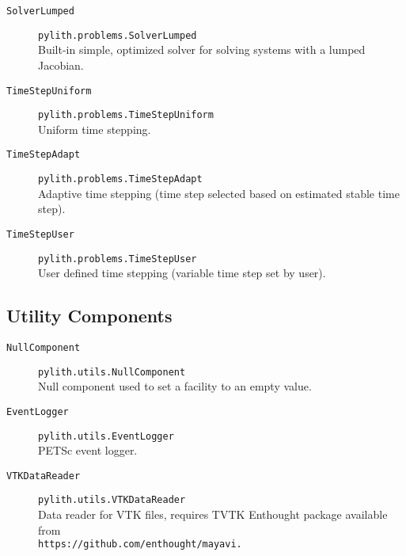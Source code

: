 \begin{description}
\item [{\texttt{SolverLumped}}] \texttt{pylith.problems.SolverLumped}\\
Built-in simple, optimized solver for solving systems with a lumped
Jacobian.
\item [{\texttt{TimeStepUniform}}] \texttt{pylith.problems.TimeStepUniform}\\
Uniform time stepping.
\item [{\texttt{TimeStepAdapt}}] \texttt{pylith.problems.TimeStepAdapt}\\
Adaptive time stepping (time step selected based on estimated stable
time step).
\item [{\texttt{TimeStepUser}}] \texttt{pylith.problems.TimeStepUser}\\
User defined time stepping (variable time step set by user).
\end{description}

\subsection{Utility Components}
\begin{description}
\item [{\texttt{NullComponent}}] \texttt{pylith.utils.NullComponent}\\
Null component used to set a facility to an empty value.
\item [{\texttt{EventLogger}}] \texttt{pylith.utils.EventLogger}\\
PETSc event logger.
\item [{\texttt{VTKDataReader}}] \texttt{pylith.utils.VTKDataReader}\\
Data reader for VTK files, requires TVTK Enthought package available
from \texttt{}~\\
\texttt{https://github.com/enthought/mayavi.}
\end{description}

